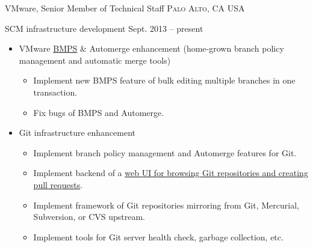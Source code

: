 \documentclass[10pt,letterpaper]{article}
\begin{document}
\headedsection
{VMware, Senior Member of Technical Staff}
{\textsc{Palo Alto, CA USA}} {
\headedsubsection 
{SCM infrastructure development} {Sept. 2013 -- present}
{
    \begin{itemize}
        \item VMware \href{http://bmps.eng.vmware.com}{BMPS} \& Automerge
            enhancement (home-grown branch policy management and automatic
            merge tools)
            \begin{itemize}
                \item Implement new BMPS feature of bulk editing multiple
                    branches in one transaction.
                \item Fix bugs of BMPS and Automerge.
            \end{itemize}
        \item Git infrastructure enhancement
            \begin{itemize}
                \item Implement branch policy management and Automerge features
                    for Git.
                \item Implement backend of a 
                    \href{http://git.eng.vmware.com}{web UI for browsing Git
                    repositories and creating pull requests}.
                \item Implement framework of Git repositories mirroring from
                    Git, Mercurial, Subversion, or CVS upstream.
                \item Implement tools for Git server health check, garbage
                    collection, etc.
            \end{itemize}

    \end{itemize}
}
}
\end{document}
